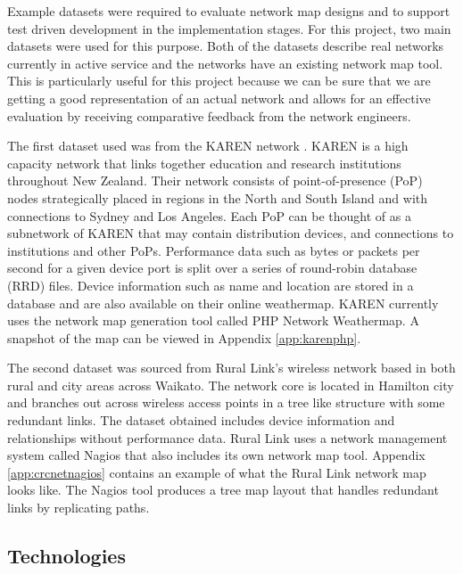 \documentclass[11pt, a4paper]{article}
\begin{document}
Example datasets were required to evaluate network map designs and to support
test driven development in the implementation stages. For this project, two main
datasets were used for this purpose. Both of the datasets describe real networks
currently in active service and the networks have an existing network map tool.
This is particularly useful for this project because we can be sure that we are
getting a good representation of an actual network and allows for an effective
evaluation by receiving comparative feedback from the network engineers. 

The first dataset used was from the KAREN network \cite{KAREN_website}. KAREN is
a high capacity network that links together education and research institutions
throughout New Zealand. Their network consists of point-of-presence (PoP) nodes
strategically placed in regions in the North and South Island and with
connections to Sydney and Los Angeles. Each PoP can be thought of as a
subnetwork of KAREN that may contain distribution devices, and connections to
institutions and other PoPs.  Performance data such as bytes or packets per
second for a given device port is split over a series of round-robin database
(RRD) files. Device information such as name and location are stored in a
database and are also available on their online weathermap. KAREN currently uses
the network map generation tool called PHP Network Weathermap. A snapshot of the
map can be viewed in Appendix \ref{app:karenphp}.


The second dataset was sourced from Rural Link's wireless network based in both
rural and city areas across Waikato. The network core is located in Hamilton
city and branches out across wireless access points in a tree like structure
with some redundant links. The dataset obtained includes device information and
relationships without performance data. Rural Link uses a network management
system called Nagios that also includes its own network map tool. Appendix
\ref{app:crcnetnagios} contains an example of what the Rural Link network map
looks like. The Nagios tool produces a tree map layout that handles redundant
links by replicating paths.


\subsection{Technologies}
\label{sec:technologies}
\end{document}
